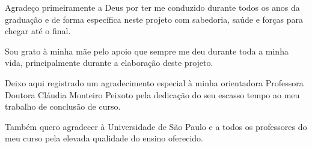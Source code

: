 \documentclass[
	12pt,
	openright,			%
	twoside,			%
	a4paper,			%
	chapter=TITLE,		%
	section=TITLE,		%
	subsection=TITLE,	%
	subsubsection=TITLE,%
	english,			%
	french,				%
	spanish,			%
	brazil				%
	]{abntex2}
\begin{document}
    \makeatletter
    \newcommand{\boxspacing}{\kern\kvtcb@left@rule\kern\kvtcb@boxsep}
    \makeatother
    \newcommand{\prompt}[4]{
        \ttfamily\llap{{\color{#2}[#3]:\hspace{3pt}#4}}\vspace{-\baselineskip}
    }
    \sloppy 


\imprimircapa
\imprimirfolhaderosto*




\begin{agradecimentos}
Agradeço primeiramente a Deus por ter me conduzido durante todos os anos da graduação e de forma específica neste projeto com sabedoria, saúde e forças para chegar até o final.

Sou grato à minha mãe pelo apoio que sempre me deu durante toda a minha vida, principalmente durante a elaboração deste projeto.

Deixo aqui registrado um agradecimento especial à minha orientadora Professora Doutora Cláudia Monteiro Peixoto pela dedicação do seu escasso tempo ao meu trabalho de conclusão de curso.

Também quero agradecer à Universidade de São Paulo e a todos os professores do meu curso pela elevada qualidade do ensino oferecido.
\end{agradecimentos}

\end{document}
